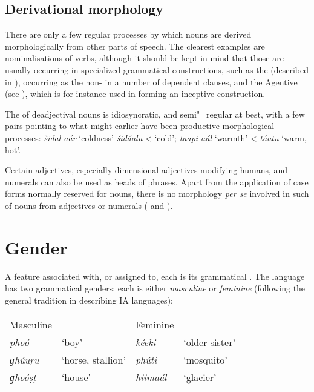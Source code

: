 \subsection{Derivational morphology}
\label{subsec:4-2-2}

There are only a few regular processes by which nouns are derived morphologically from other parts of speech. The clearest examples are nominalisations of verbs, although it should be kept in mind that those are usually occurring in specialized grammatical constructions, such as the  (described in ), occurring as the non-  in a number of dependent clauses, and the Agentive  (see ), which is for instance used in forming an inceptive construction.


The  of deadjectival nouns is idiosyncratic, and semi"=regular at best, with a few pairs pointing to what might earlier have been productive morphological processes: \textit{šidal-aár} `coldness' \textit{šidáalu} < `cold'; \textit{taapi-aál} `warmth' < \textit{táatu} `warm, hot'.     


Certain adjectives, especially dimensional adjectives modifying humans, and numerals can also be used as heads of  phrases. Apart from the application of case forms normally reserved for nouns, there is no morphology \textit{per se} involved in such  of nouns from adjectives or numerals ( and ). 


\section{Gender}
\label{sec:4-3}

A feature associated with, or assigned to, each  is its grammatical . The language has two grammatical genders; each  is either \textit{masculine} or \textit{feminine} (following the general tradition in describing IA languages): 


\begin{table}[H]
\begin{tabularx}{\textwidth}{ Q Q Q Q }
Masculine &
&
Feminine &
\\
\textit{phoó} &
`boy' &
\textit{kéeki} &
`older sister'\\
\textit{ɡhúuṛu} &
`horse, stallion' &
\textit{phúti} &
`mosquito'\\
\textit{ɡhoóṣṭ} &
`house' &
\textit{hiimaál} &
`glacier'\\
\end{tabularx}
\end{table}

